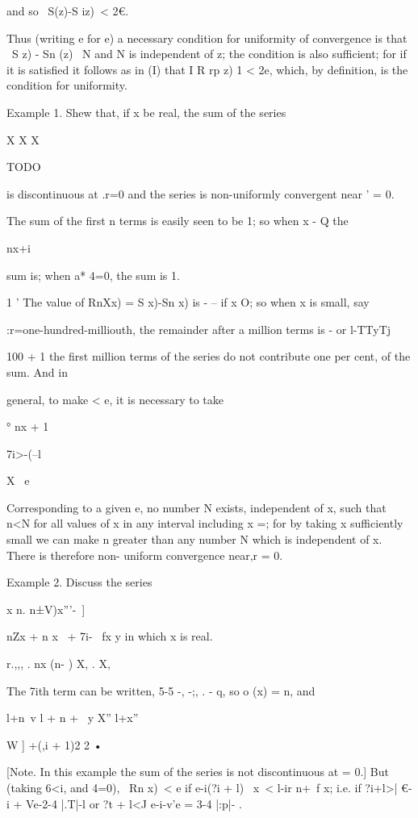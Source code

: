 and so \ S(z)-S iz)\ < 2€.

Thus (writing e for e) a necessary condition for uniformity of
convergence is that \ S z) - Sn (z) \ < e, whenever n>N and N is
independent of z; the condition is also sufficient; for if it is
satisfied it follows as in (I) that I R rp z) 1 < 2e, which, by
definition, is the condition for uniformity.

Example 1. Shew that, if x be real, the sum of the series

X X X

TODO

is discontinuous at .r=0 and the series is non-uniformly convergent
near ' = 0.

The sum of the first n terms is easily seen to be 1; so when x - Q
the

nx+i

sum is; when a* 4=0, the sum is 1.

1 ' The value of RnXx) = S x)-Sn x) is - -- if x O; so when x is
small, say

:r=one-hundred-milliouth, the remainder after a million terms is - or
l-TTyTj

100 + 1 the first million terms of the series do not contribute one
per cent, of the sum. And in

general, to make < e, it is necessary to take

° nx + 1

7i>-(--l

X \ e

Corresponding to a given e, no number N exists, independent of x, such
that n<N for all values of x in any interval including x =; for by
taking x sufficiently small we can make n greater than any number N
which is independent of x. There is therefore non- uniform convergence
near,r = 0.

Example 2. Discuss the series

x n. n±V)x'''-\ ]

nZx + n x \ + 7i- \ fx y in which x is real.

r.,,, . nx (n- ) X, . X,

The 7ith term can be written, 5-5 -, -;, . - q, so o (x) = n,
and

l+n\ v l + n + \ y X'' l+x''

  W ] +(,i + 1)2 2 •

[Note. In this example the sum of the series is not discontinuous at =
0.] But (taking 6<i, and 4=0), \ Rn x)\ < e if e-i(?i + l) \ x\ < l-ir
n+\ f x; i.e. if ?i+l>| €-i + Ve-2-4 |.T|-l or ?t + l<J e-i-v'e = 3-4
|:p|- .

